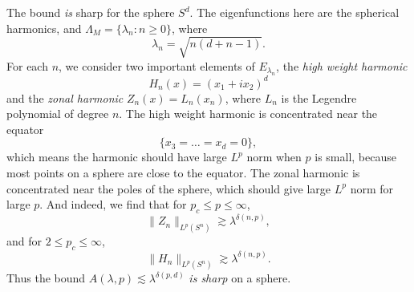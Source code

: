\documentclass{article}
\theoremstyle{plain}
\theoremstyle{remark}
\theoremstyle{definition}
\begin{document}
The bound \emph{is} sharp for the sphere $S^d$. The eigenfunctions here are the spherical harmonics, and $\Lambda_M = \{ \lambda_n : n \geq 0 \}$, where
%
\[ \lambda_n = \sqrt{n(d + n - 1)}. \]
%
For each $n$, we consider two important elements of $E_{\lambda_n}$, the \emph{high weight harmonic}
%
\[ H_n(x) = (x_1 + ix_2)^d \] 
%
and the \emph{zonal harmonic} $Z_n(x) = L_n(x_n)$, where $L_n$ is the Legendre polynomial of degree $n$. The high weight harmonic is concentrated near the equator
%
\[ \{ x_3 = \dots = x_d = 0 \}, \]
%
which means the harmonic should have large $L^p$ norm when $p$ is small, because most points on a sphere are close to the equator. The zonal harmonic is concentrated near the poles of the sphere, which should give large $L^p$ norm for large $p$. And indeed, we find that for $p_c \leq p \leq \infty$,
%
\[ \| Z_n \|_{L^p(S^n)} \gtrsim \lambda^{\delta(n,p)}, \]
%
and for $2 \leq p_c \leq \infty$,
%
\[ \| H_n \|_{L^p(S^n)} \gtrsim \lambda^{\delta(n,p)}. \]
%
Thus the bound $A(\lambda,p) \lesssim \lambda^{\delta(p,d)}$ \emph{is sharp} on a sphere.

%
%
%
%
\end{document}
